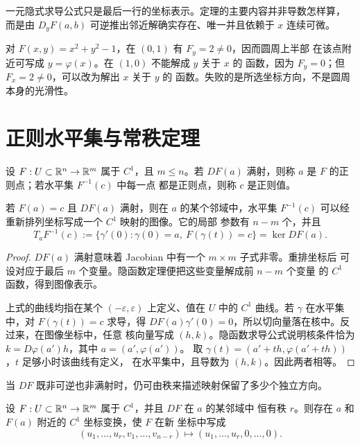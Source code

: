 一元隐式求导公式只是最后一行的坐标表示。定理的主要内容并非导数怎样算，
而是由 $D_yF(a,b)$ 可逆推出邻近解确实存在、唯一并且依赖于 $x$ 连续可微。

\begin{example}
对 $F(x,y)=x^2+y^2-1$，在 $(0,1)$ 有 $F_y=2\ne0$，因而圆周上半部
在该点附近可写成 $y=\varphi(x)$。在 $(1,0)$ 不能解成 $y$ 关于 $x$ 的
函数，因为 $F_y=0$；但 $F_x=2\ne0$，可以改为解出 $x$ 关于 $y$ 的
函数。失败的是所选坐标方向，不是圆周本身的光滑性。
\end{example}

\section{正则水平集与常秩定理}

设 $F:U\subset\mathbb{R}^n\to\mathbb{R}^m$ 属于 $C^1$，且 $m\le n$。若
$DF(a)$ 满射，则称 $a$ 是 $F$ 的正则点；若水平集 $F^{-1}(c)$ 中每一点
都是正则点，则称 $c$ 是正则值。

\begin{theorem}[正则水平集定理]
\label{thm:regular-level-set}
若 $F(a)=c$ 且 $DF(a)$ 满射，则在 $a$ 的某个邻域中，水平集
$F^{-1}(c)$ 可以经重新排列坐标写成一个 $C^1$ 映射的图像。它的局部
参数有 $n-m$ 个，并且
\[
 T_aF^{-1}(c):=\{\gamma'(0):\gamma(0)=a,
 \ F(\gamma(t))=c\}=\ker DF(a).
\]
\end{theorem}

\begin{proof}
$DF(a)$ 满射意味着 Jacobian 中有一个 $m\times m$ 子式非零。重排坐标后
可设对应于最后 $m$ 个变量。隐函数定理便把这些变量解成前 $n-m$ 个变量
的 $C^1$ 函数，得到图像表示。

上式的曲线均指在某个 \((-\varepsilon,\varepsilon)\) 上定义、值在
\(U\) 中的 \(C^1\) 曲线。若 $\gamma$ 在水平集中，对 $F(\gamma(t))=c$ 求导，得
$DF(a)\gamma'(0)=0$，所以切向量落在核中。反过来，在图像坐标中，任意
核向量写成 \((h,k)\)。隐函数求导公式说明核条件恰为
\(k=D\varphi(a')h\)，其中 \(a=(a',\varphi(a'))\)。
取 \(\gamma(t)=(a'+th,\varphi(a'+th))\)，\(t\) 足够小时该曲线有定义，
在水平集中，且导数为 \((h,k)\)。因此两者相等。
\end{proof}

当 $DF$ 既非可逆也非满射时，仍可由秩来描述映射保留了多少个独立方向。

\begin{theorem}[常秩定理]
\label{thm:constant-rank}
设 $F:U\subset\mathbb{R}^n\to\mathbb{R}^m$ 属于 $C^1$，并且 $DF$ 在 $a$ 的某邻域中
恒有秩 $r$。则存在 $a$ 和 $F(a)$ 附近的 $C^1$ 坐标变换，使 $F$ 在新
坐标中写成
\[
 (u_1,\ldots,u_r,v_1,\ldots,v_{n-r})
 \longmapsto (u_1,\ldots,u_r,0,\ldots,0).
\]
\end{theorem}

